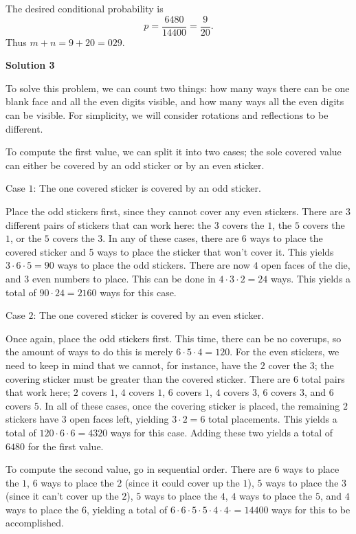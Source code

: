 \begin{enumerate}
 The desired conditional probability is
 \[p=\frac{6480}{14400}=\frac{9}{20}.\]Thus $m+n=9+20=\boxed{029}.$




\textbf{Solution 3}

To solve this problem, we can count two things: how many ways there can be one blank face and all the even digits visible, and how many ways all the even digits can be visible. For simplicity, we will consider rotations and reflections to be different.

 
To compute the first value, we can split it into two cases; the sole covered value can either be covered by an odd sticker or by an even sticker.

 
Case $1$: The one covered sticker is covered by an odd sticker.

 Place the odd stickers first, since they cannot cover any even stickers. There are $3$ different pairs of stickers that can work here: the $3$ covers the $1$, the $5$ covers the $1$, or the $5$ covers the $3$. In any of these cases, there are 6 ways to place the covered sticker and 5 ways to place the sticker that won't cover it. This yields $3 \cdot 6 \cdot 5 = 90$ ways to place the odd stickers. There are now $4$ open faces of the die, and $3$ even numbers to place. This can be done in $4 \cdot 3 \cdot 2 = 24$ ways. This yields a total of $90 \cdot 24 = 2160$ ways for this case.

 
Case $2$: The one covered sticker is covered by an even sticker.

 Once again, place the odd stickers first. This time, there can be no coverups, so the amount of ways to do this is merely $6 \cdot 5 \cdot 4 = 120$. For the even stickers, we need to keep in mind that we cannot, for instance, have the $2$ cover the $3$; the covering sticker must be greater than the covered sticker. There are $6$ total pairs that work here; $2$ covers $1$, $4$ covers $1$, $6$ covers $1$, $4$ covers $3$, $6$ covers $3$, and $6$ covers $5$. In all of these cases, once the covering sticker is placed, the remaining $2$ stickers have $3$ open faces left, yielding $3 \cdot 2 = 6$ total placements. This yields a total of $120 \cdot 6 \cdot 6 = 4320$ ways for this case. Adding these two yields a total of $6480$ for the first value.

 
To compute the second value, go in sequential order. There are $6$ ways to place the $1$, $6$ ways to place the $2$ (since it could cover up the $1$), $5$ ways to place the $3$ (since it can't cover up the $2$), $5$ ways to place the $4$, $4$ ways to place the $5$, and $4$ ways to place the $6$, yielding a total of $6 \cdot 6 \cdot 5 \cdot 5 \cdot 4 \cdot 4 \cdot = 14400$ ways for this to be accomplished.


\end{enumerate}
